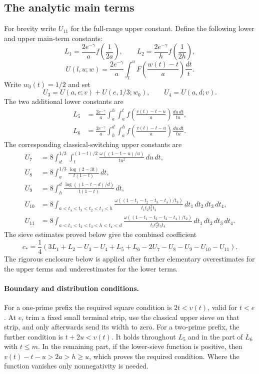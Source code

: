 \documentclass[11pt]{article}
\begin{document}
\subsection{The analytic main terms}
For brevity write $U_{11}$ for the full-range upper constant.
Define the following lower and upper main-term constants:
\[
 L_1=\frac{2e^{-\gamma}}a f\left(\frac1{2a}\right),\qquad
 L_2=\frac{2e^{-\gamma}}h f\left(\frac1{2h}\right),
\]
\[
 U(l,u;w)=\frac{2e^{-\gamma}}a\int_l^u
       F\left(\frac{w(t)-t}{a}\right)\frac{dt}{t}.
\]
Write $w_0(t)=1/2$ and set
\[
 U_3=U(a,e;v)+U(e,1/3;w_0),\qquad U_4=U(a,d;v).
\]
The two additional lower constants are
\begin{align*}
 L_5&=\frac{2e^{-\gamma}}a\int_a^h\int_a^t
       f\left(\frac{v(t)-t-u}{a}\right)\frac{du\,dt}{tu},\\
 L_6&=\frac{2e^{-\gamma}}a\int_h^d\int_a^h
       f\left(\frac{v(t)-t-u}{a}\right)\frac{du\,dt}{tu}.
\end{align*}
The corresponding classical-switching upper constants are
\begin{align*}
 U_7&=8\int_d^{1/3}\int_t^{(1-t)/2}
       \frac{\omega((1-t-u)/u)}{tu^2}\,du\,dt,\\
 U_8&=8\int_a^{1/3}\frac{\log(2-3t)}{t(1-t)}\,dt,\\
 U_9&=8\int_h^d\frac{\log((1-t-d)/d)}{t(1-t)}\,dt,\\
 U_{10}&=8\int_{a<t_4<t_3<t_2<t_1<h}
       \frac{\omega((1-t_1-t_2-t_3-t_4)/t_3)}
            {t_1t_2t_3^2t_4}\,dt_1\,dt_2\,dt_3\,dt_4,\\
 U_{11}&=8\int_{a<t_1<t_2<t_3<h<t_4<d}
       \frac{\omega((1-t_1-t_2-t_3-t_4)/t_2)}
            {t_1t_2^2t_3t_4}\,dt_1\,dt_2\,dt_3\,dt_4.
\end{align*}
The sieve estimates proved below give the combined coefficient
\[
 c_* = \frac14\left(3L_1+L_2-U_3-U_4+L_5+L_6
                  -2U_7-U_8-U_9-U_{10}-U_{11}\right).
\]
The rigorous enclosure below is applied after further elementary
overestimates for the upper terms and underestimates for the lower terms.

\paragraph{Boundary and distribution conditions.}
For a one-prime prefix the required square condition is $2t<v(t)$,
valid for $t<e$. At $e$, trim a fixed small terminal strip, use the
classical upper sieve on that strip, and only afterwards send its width
to zero. For a two-prime prefix, the further condition is
$t+2u<v(t)$. It holds throughout $L_5$ and in the part of $L_6$ with
$t\le m$. In the remaining part, if the lower-sieve function is positive,
then $v(t)-t-u>2a>h\ge u$, which proves the required condition.
Where the function vanishes only nonnegativity is needed.
\end{document}
